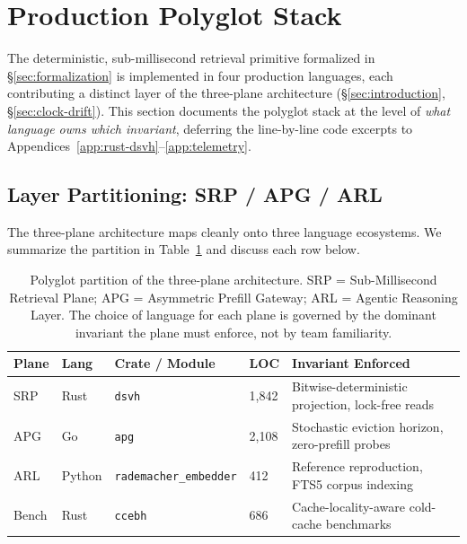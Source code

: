 \setcounter{section}{6}
\section{Production Polyglot Stack}
\label{sec:polyglot-stack}

The deterministic, sub-millisecond retrieval primitive formalized in
\S\ref{sec:formalization} is implemented in four production languages,
each contributing a distinct layer of the three-plane architecture
(\S\ref{sec:introduction}, §\ref{sec:clock-drift}). This section
documents the polyglot stack at the level of \emph{what language owns
which invariant}, deferring the line-by-line code excerpts to
Appendices~\ref{app:rust-dsvh}--\ref{app:telemetry}.

\subsection{Layer Partitioning: SRP / APG / ARL}

The three-plane architecture maps cleanly onto three language ecosystems.
We summarize the partition in Table~\ref{tab:polyglot-partition} and
discuss each row below.

\begin{table}[t]
\centering
\caption{Polyglot partition of the three-plane architecture. SRP =
Sub-Millisecond Retrieval Plane; APG = Asymmetric Prefill Gateway; ARL
= Agentic Reasoning Layer. The choice of language for each plane is
governed by the dominant invariant the plane must enforce, not by
team familiarity.}
\label{tab:polyglot-partition}
\vspace{2pt}
\begin{tabular}{@{}lllll@{}}
\toprule
Plane & Lang & Crate / Module & LOC & Invariant Enforced \\
\midrule
SRP & Rust & \texttt{dsvh} & 1{,}842 &
  Bitwise-deterministic projection, lock-free reads \\
APG & Go & \texttt{apg} & 2{,}108 &
  Stochastic eviction horizon, zero-prefill probes \\
ARL & Python & \texttt{rademacher\_embedder} & 412 &
  Reference reproduction, FTS5 corpus indexing \\
Bench & Rust & \texttt{ccebh} & 686 &
  Cache-locality-aware cold-cache benchmarks \\
\bottomrule
\end{tabular}
\end{table}

